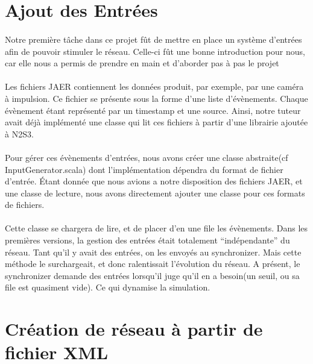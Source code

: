 \documentclass[a4paper,10pt]{article}
\begin{document}
\section{Ajout des Entrées}

\paragraph{}
Notre première tâche dans ce projet fût de mettre en place un système d'entrées afin de pouvoir stimuler le réseau. Celle-ci fût une bonne introduction pour nous, car elle nous a permis de prendre en main et d’aborder pas à pas le projet

\paragraph{}
Les fichiers JAER contiennent les données produit, par exemple, par une caméra à impulsion. Ce fichier se présente sous la forme d’une liste d'évènements. Chaque évènement étant représenté par un timestamp et une source. Ainsi, notre tuteur avait déjà implémenté une classe qui lit ces fichiers à partir d’une librairie ajoutée à N2S3. 

\paragraph{}
Pour gérer ces évènements d’entrées, nous avons créer une classe abstraite(cf InputGenerator.scala) dont l’implémentation dépendra du format de fichier d’entrée. Étant donnée que nous avions a notre disposition des fichiers JAER, et une classe de lecture, nous avons directement ajouter une classe pour ces formats de fichiers.

\paragraph{}
Cette classe se chargera de lire, et de placer d’en une file les évènements. Dans les premières versions, la gestion des entrées était totalement “indépendante” du réseau. Tant qu’il y avait des entrées, on les envoyés au synchronizer. Mais cette méthode le surchargeait, et donc ralentissait l’évolution du réseau. A présent, le synchronizer demande des entrées lorsqu’il juge qu’il en a besoin(un seuil, ou sa file est quasiment vide). Ce qui dynamise la simulation.


\section{Création de réseau à partir de fichier XML}
\end{document}
